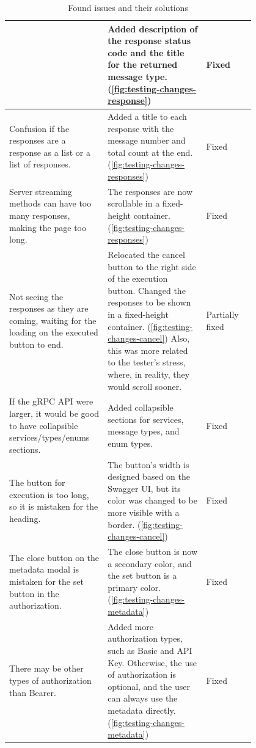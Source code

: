 \begin{table}[!htb]
{\begin{tabular}{|p{0.4\linewidth}|p{0.4\linewidth}|l|}
            & Added description of the response status code and the title for the returned message type.
            (\ref{fig:testing-changes-response})
            & Fixed \\
            \hline
            Confusion if the responses are a response as a list or a list of responses.
            & Added a title to each response with the message number and total count at the end.
            (\ref{fig:testing-changes-responses})
            & Fixed \\
            \hline
            Server streaming methods can have too many responses, making the page too long.
            & The responses are now scrollable in a fixed-height container.
            (\ref{fig:testing-changes-responses})
            & Fixed \\
            \hline
            Not seeing the responses as they are coming, waiting for the loading on the executed button to end.
            & Relocated the cancel button to the right side of the execution button.
            Changed the responses to be shown in a fixed-height container.
            (\ref{fig:testing-changes-cancel})
            Also, this was more related to the tester's stress, where, in reality, they would scroll sooner.
            & Partially fixed \\
            \hline
            If the gRPC API were larger, it would be good to have collapsible services/types/enums sections.
            & Added collapsible sections for services, message types, and enum types.
            & Fixed \\
            \hline
            The button for execution is too long, so it is mistaken for the heading.
            & The button's width is designed based on the Swagger UI, but its color was changed to be more visible with a border.
            (\ref{fig:testing-changes-cancel})
            & Fixed \\
            \hline
            The close button on the metadata modal is mistaken for the set button in the authorization.
            & The close button is now a secondary color, and the set button is a primary color.
            (\ref{fig:testing-changes-metadata})
            & Fixed \\
            \hline
            There may be other types of authorization than Bearer.
            & Added more authorization types, such as Basic and API Key.
            Otherwise, the use of authorization is optional, and the user can always use the metadata directly.
            (\ref{fig:testing-changes-metadata})
            & Fixed \\
            \hline
        \end{tabular}
    }
    \caption{Found issues and their solutions}
    \label{tab:user-testing-issues}
\end{table}


